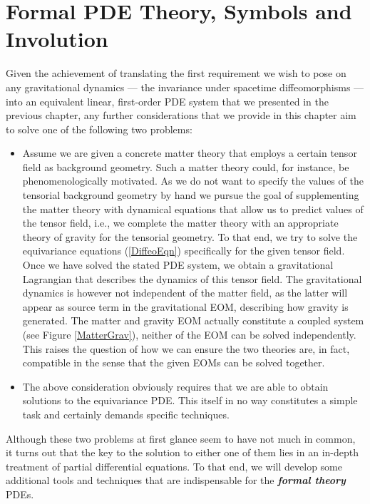 \section{Formal PDE Theory, Symbols and Involution}
Given the achievement of translating the first requirement we wish to pose on any gravitational dynamics --- the invariance under spacetime diffeomorphisms --- into an equivalent linear, first-order PDE system that we presented in the previous chapter, any further considerations that we provide in this chapter aim to solve one of the following two problems:
\begin{itemize}
    \item Assume we are given a concrete matter theory that employs a certain tensor field as background geometry.
    Such a matter theory could, for instance, be phenomenologically motivated. As we do not want to specify the values of the tensorial background geometry by hand we pursue the goal of supplementing the matter theory with dynamical equations that allow us to predict values of the tensor field, i.e., we complete the matter theory with an appropriate theory of gravity for the tensorial geometry. To that end, we try to solve the equivariance equations (\ref{DiffeoEqn}) specifically for the given tensor field. 
    Once we have solved the stated PDE system, we obtain a gravitational Lagrangian that describes the dynamics of this tensor field. The gravitational dynamics is however not independent of the matter field, as the latter will appear as source term in the gravitational EOM, describing how gravity is generated.
    The matter and gravity EOM actually constitute a coupled system (see Figure \ref{MatterGrav}), neither of the EOM can be solved independently. This raises the question of how we can ensure the two theories are, in fact, compatible in the sense that the given EOMs can be solved together.
    \item The above consideration obviously requires that we are able to obtain solutions to the equivariance PDE. This itself in no way constitutes a simple task and certainly demands specific techniques.
\end{itemize}
Although these two problems at first glance seem to have not much in common, it turns out that the key to the solution to either one of them lies in an in-depth treatment of partial differential equations. 
To that end, we will develop some additional tools and techniques that are indispensable for the  \textit{\textbf{formal theory}} PDEs.

